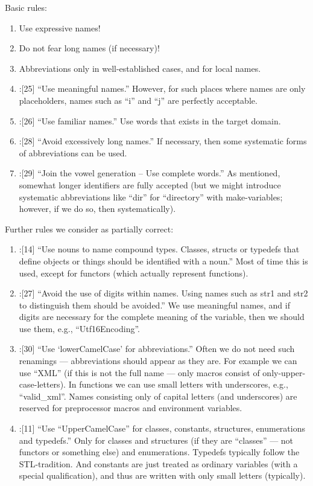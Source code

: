 \documentclass{book}
\begin{document}
Basic rules:
\begin{enumerate}
\item Use expressive names!
\item Do not fear long names (if necessary)!
\item Abbreviations only in well-established cases, and for local names.
\item \cite{OKL_MisfeldtBumgardnerGray2004CppStyle}:[25] ``Use meaningful names.'' However, for such places where names are only placeholders, names such as ``i'' and ``j'' are perfectly acceptable.
\item \cite{OKL_MisfeldtBumgardnerGray2004CppStyle}:[26] ``Use familiar names.'' Use words that exists in the target domain.
\item \cite{OKL_MisfeldtBumgardnerGray2004CppStyle}:[28] ``Avoid excessively long names.'' If necessary, then some systematic forms of abbreviations can be used.
\item \cite{OKL_MisfeldtBumgardnerGray2004CppStyle}:[29] ``Join the vowel generation -- Use complete words.'' As mentioned, somewhat longer identifiers are fully accepted (but we might introduce systematic abbreviations like ``dir'' for ``directory'' with make-variables; however, if we do so, then systematically).
\end{enumerate}

Further rules we consider as partially correct:
\begin{enumerate}
\item \cite{OKL_MisfeldtBumgardnerGray2004CppStyle}:[14] ``Use nouns to name compound types. Classes, structs or typedefs that define objects or things should be identified with a noun.'' Most of time this is used, except for functors (which actually represent functions).
\item \cite{OKL_MisfeldtBumgardnerGray2004CppStyle}:[27] ``Avoid the use of digits within names. Using names such as str1 and str2 to distinguish them should be avoided.'' We use meaningful names, and if digits are necessary for the complete meaning of the variable, then we should use them, e.g., ``Utf16Encoding''.
\item \cite{OKL_MisfeldtBumgardnerGray2004CppStyle}:[30] ``Use `lowerCamelCase' for abbreviations.'' Often we do not need such renamings --- abbreviations should appear as they are. For example we can use ``XML'' (if this is not the full name --- only macros consist of only-upper-case-letters). In functions we can use small letters with underscores, e.g., ``valid\_xml''. Names consisting only of capital letters (and underscores) are reserved for preprocessor macros and environment variables.
\item \cite{OKL_MisfeldtBumgardnerGray2004CppStyle}:[11] ``Use ``UpperCamelCase'' for classes, constants, structures, enumerations and typedefs.'' Only for classes and structures (if they are ``classes'' --- not functors or something else) and enumerations. Typedefs typically follow the STL-tradition. And constants are just treated as ordinary variables (with a special qualification), and thus are written with only small letters (typically).
\end{enumerate}
\end{document}
